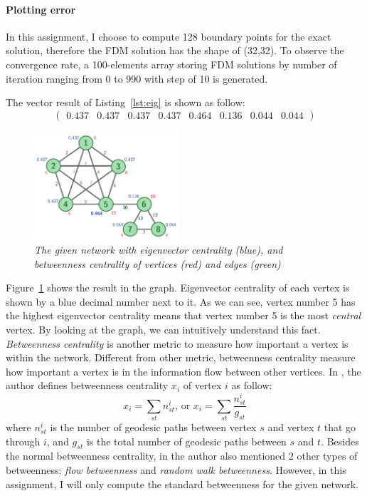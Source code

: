 \documentclass[a4paper,12pt]{article}
\begin{document}
\paragraph{Plotting error} In this assignment, I choose to compute 128 boundary points for the exact solution, therefore the FDM solution has the shape of (32,32). To observe the convergence rate, a 100-elements array storing FDM solutions by number of iteration ranging from 0 to 990 with step of 10 is generated.

\pagebreak

\noindent
The vector result of Listing~\ref{lst:eig} is shown as follow:
\[ \left( \begin{array}{cccccccc} 0.437 & 0.437 & 0.437 & 0.437 & 0.464 & 0.136 & 0.044 & 0.044 \end{array} \right) \]
\begin{figure}
    \vspace{-1em}
    \centering
      \includegraphics[width=0.48\textwidth]{cn_a2_eigbet}
    \caption{\emph{The given network with eigenvector centrality (blue), and betweenness centrality of vertices (red) and edges (green)}}
    \label{fig:eigbet}
    \vspace{-1em}
\end{figure}
\noindent
Figure~\ref{fig:eigbet} shows the result in the graph. Eigenvector centrality of each vertex is shown by a blue decimal number next to it. As we can see, vertex number 5 has the highest eigenvector centrality means that vertex number 5 is the most \emph{central} vertex. By looking at the graph, we can intuitively understand this fact.
\newline
\noindent
\emph{Betweenness centrality} is another metric to measure how important a vertex is within the network. Different from other metric, betweenness centrality measure how important a vertex is in the information flow between other vertices. In \cite{net}, the author defines betweenness centrality $x_i$ of vertex $i$ as follow:
$$ x_i = \displaystyle \sum_{st} n_{st}^i \mbox{, or } x_i = \displaystyle \sum_{st} \frac{n_{st}^i}{g_{st}} $$
where $n^i_{st}$ is the number of geodesic paths between vertex $s$ and vertex $t$ that go through $i$, and $g_{st}$ is the total number of geodesic paths between $s$ and $t$. Besides the normal betweenness centrality, in \cite{net} the author also mentioned 2 other types of betweenness: \emph{flow betweenness} and \emph{random walk betweenness}. However, in this assignment, I will only compute the standard betweenness for the given network.
\end{document}
